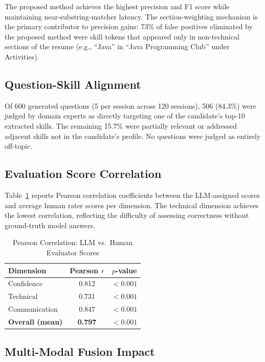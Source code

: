 \documentclass[conference]{IEEEtran}
\begin{document}
The proposed method achieves the highest precision and F1 score while maintaining near-substring-matcher latency. The section-weighting mechanism is the primary contributor to precision gains: 73\% of false positives eliminated by the proposed method were skill tokens that appeared only in non-technical sections of the resume (e.g., ``Java'' in ``Java Programming Club'' under Activities).

\subsection{Question-Skill Alignment}

Of 600 generated questions (5 per session across 120 sessions), 506 (84.3\%) were judged by domain experts as directly targeting one of the candidate's top-10 extracted skills. The remaining 15.7\% were partially relevant or addressed adjacent skills not in the candidate's profile. No questions were judged as entirely off-topic.

\subsection{Evaluation Score Correlation}

Table~\ref{tab:eval_correlation} reports Pearson correlation coefficients between the LLM-assigned scores and average human rater scores per dimension. The technical dimension achieves the lowest correlation, reflecting the difficulty of assessing correctness without ground-truth model answers.

\begin{table}[htbp]
\caption{Pearson Correlation: LLM vs.\ Human Evaluator Scores}
\label{tab:eval_correlation}
\centering
\begin{tabular}{lcc}
\toprule
\textbf{Dimension} & \textbf{Pearson $r$} & \textbf{$p$-value} \\
\midrule
Confidence      & 0.812 & $<0.001$ \\
Technical       & 0.731 & $<0.001$ \\
Communication   & 0.847 & $<0.001$ \\
\textbf{Overall (mean)} & \textbf{0.797} & $<0.001$ \\
\bottomrule
\end{tabular}
\end{table}

\subsection{Multi-Modal Fusion Impact}
\end{document}
